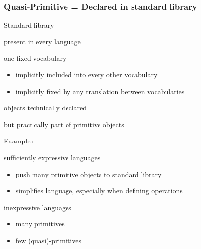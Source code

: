 \begin{frame}\frametitle{Quasi-Primitive = Declared in standard library}
\begin{blockitems}{Standard library}
 \item present in every language
 \item one fixed vocabulary
  \begin{itemize}
  \item implicitly included into every other vocabulary
  \item implicitly fixed by any translation between vocabularies
  \end{itemize}
 \item objects technically declared
 \item but practically part of primitive objects
\end{blockitems}

\begin{blockitems}{Examples}
\item sufficiently expressive languages
 \begin{itemize}
 \item push many primitive objects to standard library 
 \item simplifies language, especially when defining operations
 \end{itemize}
\item inexpressive languages
\begin{itemize}
\item many primitives 
\item few (quasi)-primitives 
\end{itemize}
\end{blockitems}
\end{frame}

